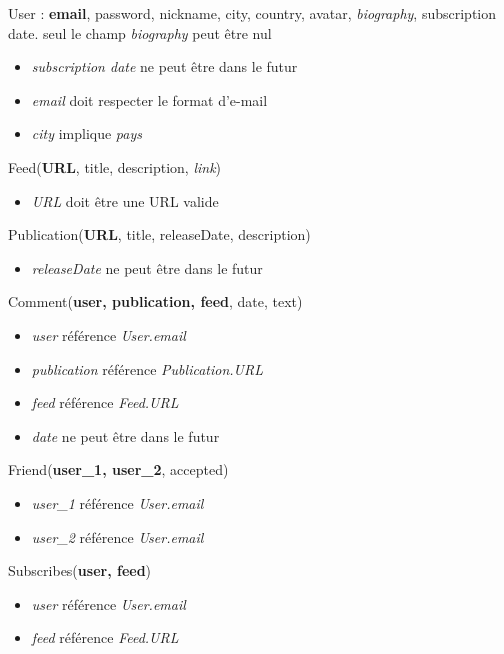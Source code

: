 \documentclass[a4paper,10pt]{article}
\begin{document}
        User : \textbf{email}, password, nickname, city, country, avatar, \textit{biography}, subscription date.
            seul le champ \textit{biography} peut être nul
            \begin{itemize}            
             \item \textit{subscription date} ne peut être dans le futur
             \item \textit{email} doit respecter le format d'e-mail
             \item \textit{city} implique \textit{pays}
            \end{itemize}


        Feed(\textbf{URL}, title, description, \textit{link})
            \begin{itemize}
            \item \textit{URL} doit être une URL valide
	    \end{itemize}
        
        Publication(\textbf{URL}, title, releaseDate, description)
        \begin{itemize}            
            \item \textit{releaseDate} ne peut être dans le futur
        \end{itemize}

        Comment(\textbf{user, publication, feed}, date, text)
        \begin{itemize}
            \item \textit{user} référence \textit{User.email}
            \item \textit{publication} référence \textit{Publication.URL}
            \item \textit{feed} référence \textit{Feed.URL}
            \item \textit{date} ne peut être dans le futur
        \end{itemize}
        
        Friend(\textbf{user\_1, user\_2}, accepted)
        \begin{itemize}            
            \item \textit{user\_1} référence \textit{User.email}
            \item \textit{user\_2} référence \textit{User.email}
        \end{itemize}

        Subscribes(\textbf{user, feed})
        \begin{itemize}            
            \item \textit{user} référence \textit{User.email}
            \item \textit{feed} référence \textit{Feed.URL}
        \end{itemize}
\end{document}
